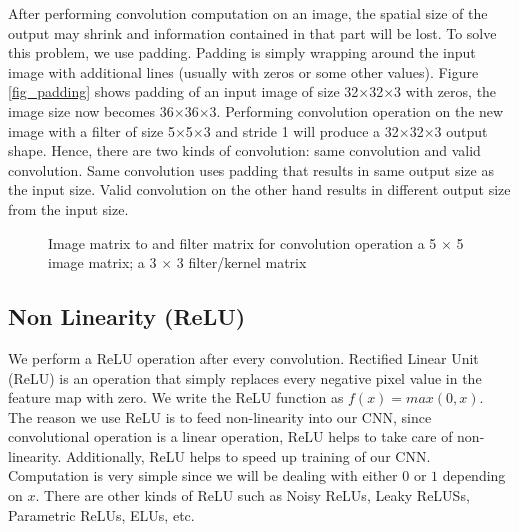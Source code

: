 \documentclass[master]{thesis-uestc}
\begin{document}
After performing convolution computation on an image, the spatial size of the output may shrink and information contained in that part will be lost. To solve this problem, we use padding. Padding is simply wrapping around the input image with additional lines (usually with zeros or some other values). Figure \ref{fig_padding} shows padding of an input image of size 32$\times$32$\times$3 with zeros, the image size now becomes 36$\times$36$\times$3. Performing convolution operation on the new image with a filter of size 5$\times$5$\times$3 and stride 1 will produce a 32$\times$32$\times$3 output shape. Hence, there are two kinds of convolution: same convolution and valid convolution. Same convolution uses padding that results in same output size as the input size. Valid convolution on the other hand results in different output size from the input size.
\begin{figure}%
\centering
{}%
\hspace{8pt}%
\caption[Image matrix to and filter matrix for convolution operation]{Image matrix to and filter matrix for convolution operation
 a 5 $\times$ 5 image matrix;
 a 3 $\times$ 3 filter/kernel matrix}
\label{fig:convolution}
\end{figure}

\subsection{Non Linearity (ReLU)}
We perform a ReLU operation after every convolution. Rectified Linear Unit (ReLU) is an operation that simply replaces every negative pixel value in the feature map with zero. We write the ReLU function as $f(x) = max(0,x)$. The reason we use ReLU is to feed non-linearity into our CNN, since convolutional operation is a linear operation, ReLU helps to take care of non-linearity. Additionally, ReLU helps to speed up training of our CNN. Computation is very simple since we will be dealing with either $0$ or $1$ depending on $x$. There are other kinds of ReLU such as Noisy ReLUs\cite{Nair:2010:RLU:3104322.3104425}, Leaky ReLUSs\cite{Maas2013RectifierNI}, Parametric ReLUs\cite{7410480}, ELUs\cite{Clevert2015FastAA}, etc.
\end{document}
